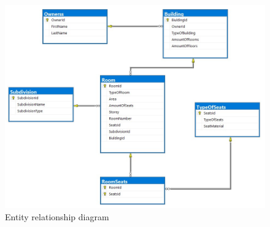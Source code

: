 \documentclass[a4paper,12pt]{article}
\begin{document}
\newpage
		\begin{figure}[h!]
		\begin{center}
			\begin{minipage}[h]{1.05\linewidth}
				\includegraphics[width=1\linewidth]{Prt sc/Entity relationship diagram.jpg}
			\end{minipage}
		\end{center}
		\caption{Entity relationship diagram}
	\end{figure}
	
\end{document}
